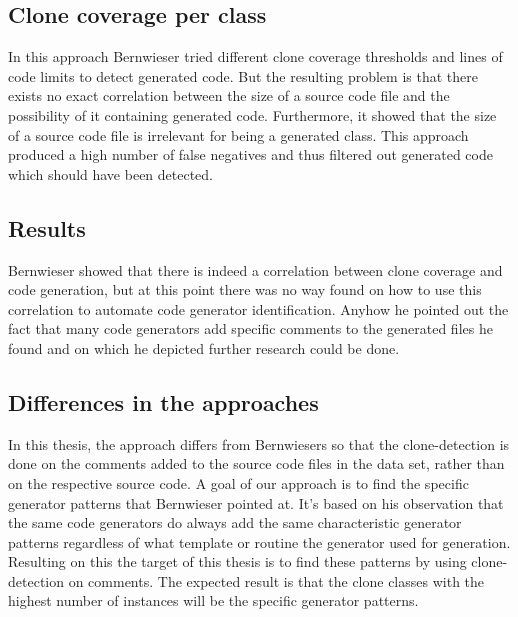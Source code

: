 \subsection{Clone coverage per class}
In this approach Bernwieser tried different clone coverage thresholds and lines of code limits to detect generated code. But the resulting problem is that there exists no exact correlation between the size of a source code file and the possibility of it containing generated code. Furthermore, it showed that the size of a source code file is irrelevant for being a generated class. This approach produced a high number of false negatives and thus filtered out generated code which should have been detected.

\subsection{Results}
Bernwieser showed that there is indeed a correlation between clone coverage and code generation, but at this point there was no way found on how to use this correlation to automate code generator identification. Anyhow he pointed out the fact that many code generators add specific comments to the generated files he found and on which he depicted further research could be done.

\subsection{Differences in the approaches}
In this thesis, the approach differs from Bernwiesers so that the clone-detection is done on the comments added to the source code files in the data set, rather than on the respective source code. A goal of our approach is to find the specific generator patterns that Bernwieser pointed at. It's based on his observation that the same code generators do always add the same characteristic generator patterns regardless of what template or routine the generator used for generation. Resulting on this the target of this thesis is to find these patterns by using clone-detection on comments. The expected result is that the clone classes with the highest number of instances will be the specific generator patterns.

